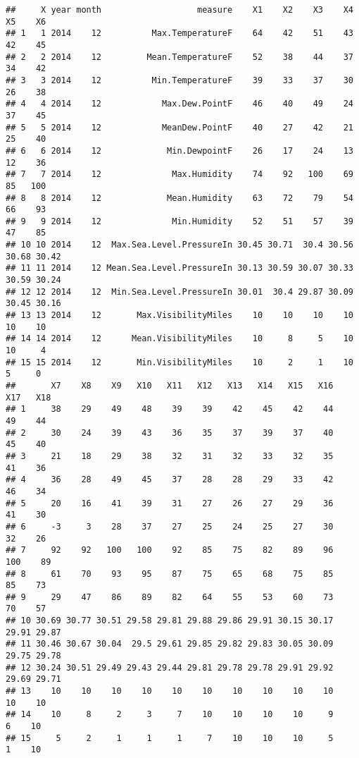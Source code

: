 \documentclass[
]{article}
\begin{document}
\begin{verbatim}
##     X year month                   measure    X1    X2    X3    X4    X5    X6
## 1   1 2014    12          Max.TemperatureF    64    42    51    43    42    45
## 2   2 2014    12         Mean.TemperatureF    52    38    44    37    34    42
## 3   3 2014    12          Min.TemperatureF    39    33    37    30    26    38
## 4   4 2014    12            Max.Dew.PointF    46    40    49    24    37    45
## 5   5 2014    12            MeanDew.PointF    40    27    42    21    25    40
## 6   6 2014    12             Min.DewpointF    26    17    24    13    12    36
## 7   7 2014    12              Max.Humidity    74    92   100    69    85   100
## 8   8 2014    12             Mean.Humidity    63    72    79    54    66    93
## 9   9 2014    12              Min.Humidity    52    51    57    39    47    85
## 10 10 2014    12  Max.Sea.Level.PressureIn 30.45 30.71  30.4 30.56 30.68 30.42
## 11 11 2014    12 Mean.Sea.Level.PressureIn 30.13 30.59 30.07 30.33 30.59 30.24
## 12 12 2014    12  Min.Sea.Level.PressureIn 30.01  30.4 29.87 30.09 30.45 30.16
## 13 13 2014    12       Max.VisibilityMiles    10    10    10    10    10    10
## 14 14 2014    12      Mean.VisibilityMiles    10     8     5    10    10     4
## 15 15 2014    12       Min.VisibilityMiles    10     2     1    10     5     0
##       X7    X8    X9   X10   X11   X12   X13   X14   X15   X16   X17   X18
## 1     38    29    49    48    39    39    42    45    42    44    49    44
## 2     30    24    39    43    36    35    37    39    37    40    45    40
## 3     21    18    29    38    32    31    32    33    32    35    41    36
## 4     36    28    49    45    37    28    28    29    33    42    46    34
## 5     20    16    41    39    31    27    26    27    29    36    41    30
## 6     -3     3    28    37    27    25    24    25    27    30    32    26
## 7     92    92   100   100    92    85    75    82    89    96   100    89
## 8     61    70    93    95    87    75    65    68    75    85    85    73
## 9     29    47    86    89    82    64    55    53    60    73    70    57
## 10 30.69 30.77 30.51 29.58 29.81 29.88 29.86 29.91 30.15 30.17 29.91 29.87
## 11 30.46 30.67 30.04  29.5 29.61 29.85 29.82 29.83 30.05 30.09 29.75 29.78
## 12 30.24 30.51 29.49 29.43 29.44 29.81 29.78 29.78 29.91 29.92 29.69 29.71
## 13    10    10    10    10    10    10    10    10    10    10    10    10
## 14    10     8     2     3     7    10    10    10    10     9     6    10
## 15     5     2     1     1     1     7    10    10    10     5     1    10

\end{verbatim}
\end{document}
